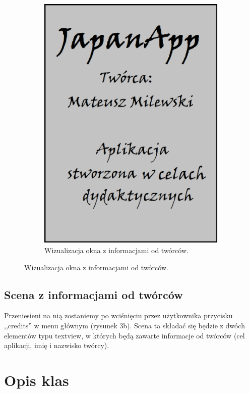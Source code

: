 \documentclass[15pt]{article}
\begin{document}
\begin{figure}[h!]
\begin{subfigure}[b]{0.35\linewidth}
      \includegraphics[width=\linewidth]{credits.png}
      \caption{Wizualizacja okna z informacjami od twórców.}
    \end{subfigure}
    \label{fig:coffee}
  \end{figure}
  
  \newpage
  \subsection{Scena z informacjami od twórców}
  Przeniesieni na nią zostaniemy po wciśnięciu przez użytkownika przycisku ,,credits'' w menu głównym (rysunek 3b). Scena ta składać się będzie z dwóch elementów typu textview, w których będą zawarte informacje od twórców (cel aplikacji, imię i nazwisko twórcy).
  
  \section{Opis klas}
  
\end{document}
